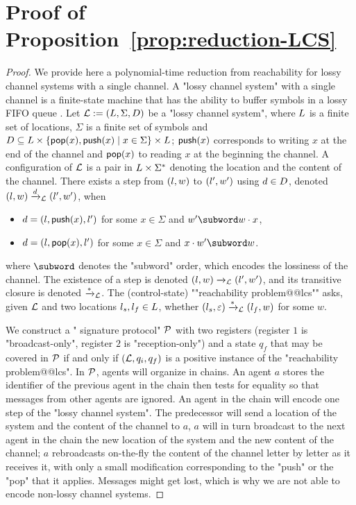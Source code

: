 \section{Proof of Proposition~\ref{prop:reduction-LCS}}
\label{app:reduction-lcs}

\propReductionLCS*
\begin{proof}
	We provide here a polynomial-time reduction from reachability for lossy channel systems with a single channel. A "lossy channel system" with a single channel is a finite-state machine that has the ability to buffer symbols in a lossy FIFO queue \cite{Schnoebelen2002verifying}. 
	Let $\mathcal{L} := (L,\Sigma, D)$ be a "lossy channel system", where $L$ is a finite set of locations, $\Sigma$ is a finite set of symbols and $D \subseteq L \times \{\mathsf{pop}(x), \mathsf{push}(x) \mid x \in \Sigma\} \times L$; $\mathsf{push}(x)$ corresponds to writing $x$ at the end of the channel and $\mathsf{pop}(x)$ to reading $x$ at the beginning the channel. A configuration of $\mathcal{L}$ is a pair in $L \times \Sigma^*$ denoting the location and the content of the channel. There exists a step from $(l,w)$ to $(l',w')$ using $d \in D$, denoted $(l,w) \xrightarrow{d}_{\mathcal{L}} (l',w')$, when
	\begin{itemize}
		\item $d = (l,\mathsf{push}(x),l')$ for some $x \in \Sigma$ and $w' \subword w \cdot x$,
		\item $d = (l,\mathsf{pop}(x),l')$ for some $x \in \Sigma$ and $x \cdot w' \subword w$.
	\end{itemize}
	where $\subword$ denotes the "subword" order, which encodes the lossiness of the channel. 
	The existence of a step is denoted $(l,w) \xrightarrow{}_{\mathcal{L}} (l',w')$, and its transitive closure is denoted $\xrightarrow{*}_{\mathcal{L}}$. The (control-state) ""reachability problem@@lcs"" asks, given $\mathcal{L}$ and two locations $l_s, l_f \in L$, whether $(l_s,\varepsilon) \xrightarrow{*}_{\mathcal{L}} (l_f, w)$ for some $w$. 
	
	We construct a " signature protocol" $\mathcal{P}$ with two registers (register $1$ is "broadcast-only", register $2$ is "reception-only") and a state $q_f$ that may be covered in $\mathcal{P}$ if and only if $(\mathcal{L}, q_i, q_f)$ is a positive instance of the "reachability problem@@lcs". 
	In $\mathcal{P}$, agents will organize in chains.
	An agent $a$ stores the identifier of the previous agent in the chain then tests for equality so that messages from other agents are ignored. An agent in the chain will encode one step of the "lossy channel system". 
	The predecessor will send a location of the system and the content of the channel to $a$, $a$ will in turn broadcast to the next agent in the chain the new location of the system and the new content of the channel; $a$ rebroadcasts on-the-fly the content of the channel letter by letter as it receives it, with only a small modification corresponding to the "push" or the "pop" that it applies. Messages might get lost, which is why we are not able to encode non-lossy channel systems.
	

\end{proof}
